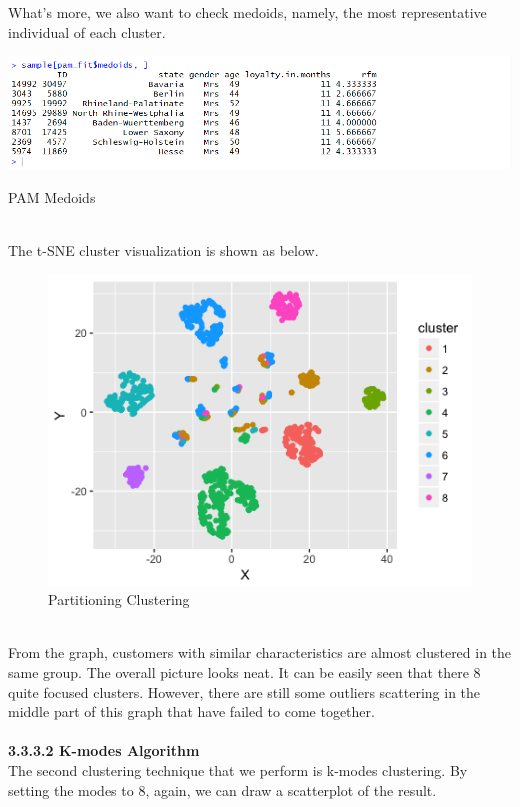 \documentclass[a4paper,12pt,fleqn]{article}
\begin{document}
What's more, we also want to check medoids, namely, the most representative individual of each cluster.
\begin{table}[htp]
	\centering
	\includegraphics[width=0.95\linewidth]{"13.pam medoids"}
	\caption{PAM Medoids}
	\label{fig:13}
\end{table}\\
The t-SNE cluster visualization is shown as below. 
\begin{figure}[htp]
	\centering
	\includegraphics[width=0.7\linewidth]{"14.partitioning clustering"}
	\caption{Partitioning Clustering}
	\label{fig:14}
\end{figure}\\
From the graph, customers with similar characteristics are almost clustered in the same group. The overall picture looks neat. It can be easily seen that there 8 quite focused clusters. However, there are still some outliers scattering in the middle part of this graph that have failed to come together.\\
\\
\newline
\newline
\textbf{3.3.3.2 K-modes Algorithm}\\
The second clustering technique that we perform is k-modes clustering. By setting the modes to 8, again, we can draw a scatterplot of the result.\\
\end{document}
